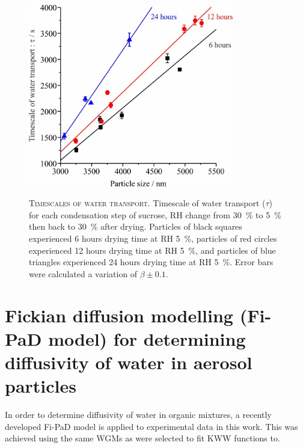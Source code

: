 \begin{figure}
    \centering
    \caption[Timescales of water transport]{\textsc{Timescales of water transport}. Timescale of water transport ($\tau$) for each condensation step of sucrose, RH change from \SI{30}{\percent} to \SI{5}{\percent} then back to \SI{30}{\percent} after drying. Particles of black squares experienced \num{6} hours drying time at RH \SI{5}{\percent}, particles of red circles experienced \num{12} hours drying time at RH \SI{5}{\percent}, and particles of blue triangles experienced \num{24} hours drying time at RH \SI{5}{\percent}. Error bars were calculated a variation of $\beta \pm \num{0.1}$.}
    \includegraphics[width=0.8\textwidth]{chapters/water_hopping/figures/image006.jpg}
    \label{fig:wat_s4}
\end{figure}

\section{Fickian diffusion modelling (Fi-PaD model) for determining diffusivity of water in aerosol particles}

In order to determine diffusivity of water in organic mixtures, a recently developed Fi-PaD model is applied to experimental data in this work. This was achieved using the same WGMs as were selected to fit KWW functions to.

